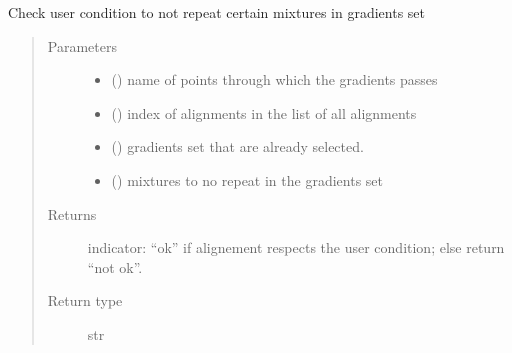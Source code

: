 \documentclass[letterpaper,10pt,english]{sphinxmanual}
\begin{document}
\label{\detokenize{ExperimentsPlannification:module-modules}}

\begin{fulllineitems}
\label{\detokenize{ExperimentsPlannification:modules.check_not_repeat}}
\sphinxAtStartPar
Check user condition to not repeat certain mixtures in gradients set
\begin{quote}\begin{description}
\item[{Parameters}] \leavevmode\begin{itemize}
\item {} 
\sphinxAtStartPar
{} () \textendash{} name of points through which the gradients passes

\item {} 
\sphinxAtStartPar
{} () \textendash{} index of alignments in the list of all alignments

\item {} 
\sphinxAtStartPar
{} () \textendash{} gradients set that are already selected.

\item {} 
\sphinxAtStartPar
{} () \textendash{} mixtures to no repeat in the gradients set

\end{itemize}

\item[{Returns}] \leavevmode
\sphinxAtStartPar
indicator: “ok” if alignement respects the user condition; else return “not ok”.

\item[{Return type}] \leavevmode
\sphinxAtStartPar
str

\end{description}\end{quote}

\end{fulllineitems}
\end{document}
